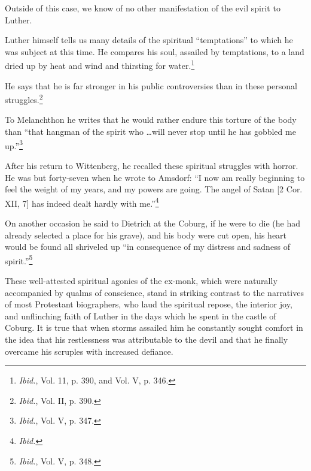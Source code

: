 Outside of this
case, we know of no other manifestation of the evil spirit to Luther.

Luther himself tells us many details of the spiritual “temptations”
to which he was subject at this time. He compares his soul, assailed
by temptations, to a land dried up by heat and wind and thirsting for
water.\footnote{\textit{Ibid.}, Vol. 11, p. 390, and Vol. V, p. 346.}

He says that he is far stronger in his public controversies than
in these personal struggles.\footnote{\textit{Ibid.}, Vol. II, p. 390.}

To Melanchthon he writes that he would
rather endure this torture of the body than “that hangman of the
spirit who \dots will never stop until he has gobbled me up.”\footnote{\textit{Ibid.}, Vol. V, p. 347.}

After
his return to Wittenberg, he recalled these spiritual struggles with
horror. He was but forty-seven when he wrote to Amsdorf: “I now
am really beginning to feel the weight of my years, and my powers
are going. The angel of Satan [2 Cor. XII, 7] has indeed dealt hardly
with me.”\footnote{\textit{Ibid.}}

On another occasion he said to Dietrich at the Coburg,
if he were to die (he had already selected a place for his grave),
and his body were cut open, his heart would be found all shriveled
up “in consequence of my distress and sadness of spirit.”\footnote{\textit{Ibid.}, Vol. V, p. 348.}


These well-attested spiritual agonies of the ex-monk, which were
naturally accompanied by qualms of conscience, stand in striking
contrast to the narratives of most Protestant biographers, who laud
the spiritual repose, the interior joy, and unflinching faith of Luther
in the days which he spent in the castle of Coburg. It is true that when
storms assailed him he constantly sought comfort in the idea that his
restlessness was attributable to the devil and that he finally overcame
his scruples with increased defiance.

